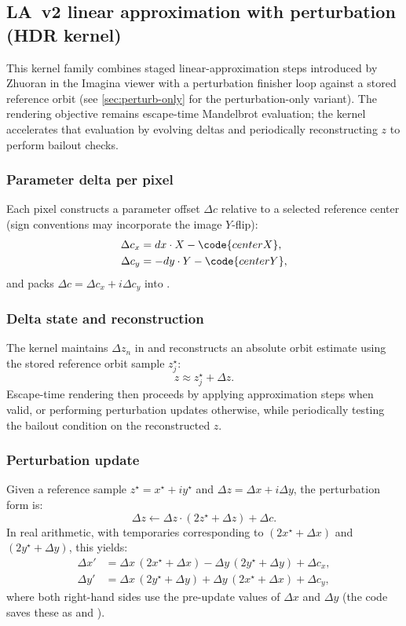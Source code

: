 \subsection{LA~v2 linear approximation with perturbation (HDR kernel)}
\label{sec:la-v2-perturb}

This kernel family combines staged linear-approximation steps introduced by
Zhuoran in the Imagina viewer \cite{Imagina} with a
perturbation finisher loop against a stored reference orbit
(see \cref{sec:perturb-only} for the perturbation-only variant). The rendering
objective remains escape-time Mandelbrot evaluation; the kernel accelerates
that evaluation by evolving deltas and periodically reconstructing \(z\) to
perform bailout checks.

\subsubsection{Parameter delta per pixel}
Each pixel constructs a parameter offset \(\Delta c\) relative to a selected
reference center (sign conventions may incorporate the image \(Y\)-flip):
\begin{align}
\Delta c_x &= dx\cdot X - \code{centerX}, \\
\Delta c_y &= -dy\cdot Y - \code{centerY},
\end{align}
and packs \(\Delta c=\Delta c_x+i\Delta c_y\) into .

\subsubsection{Delta state and reconstruction}
The kernel maintains \(\Delta z_n\) in  and reconstructs an
absolute orbit estimate using the stored reference orbit sample
\(z_j^\star\):
\[
z \approx z_j^\star + \Delta z.
\]
Escape-time rendering then proceeds by applying approximation steps when valid,
or performing perturbation updates otherwise, while periodically testing the
bailout condition on the reconstructed \(z\).

\subsubsection{Perturbation update}
Given a reference sample \(z^\star=x^\star+iy^\star\) and \(\Delta z=\Delta
x+i\Delta y\), the perturbation form is:
\[
\Delta z \leftarrow \Delta z\cdot(2z^\star+\Delta z) + \Delta c.
\]
In real arithmetic, with temporaries corresponding to \((2x^\star+\Delta x)\)
and \((2y^\star+\Delta y)\), this yields:
\begin{align}
\Delta x' &= \Delta x\,(2x^\star+\Delta x) - \Delta y\,(2y^\star+\Delta y) + \Delta c_x, \\
\Delta y' &= \Delta x\,(2y^\star+\Delta y) + \Delta y\,(2x^\star+\Delta x) + \Delta c_y,
\end{align}
where both right-hand sides use the pre-update values of \(\Delta x\) and
\(\Delta y\) (the code saves these as  and
).

